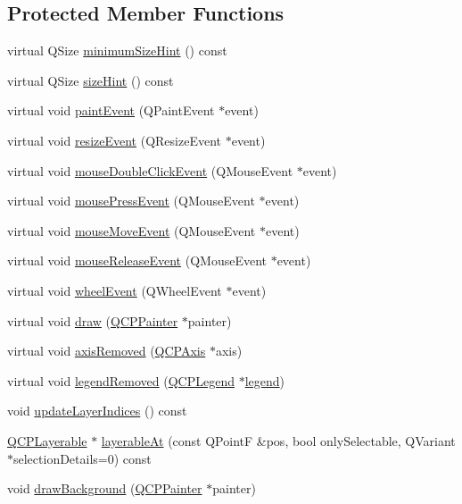 \subsection*{Protected Member Functions}
\begin{DoxyCompactItemize}
\item 
virtual Q\-Size \hyperlink{class_q_custom_plot_a4904f06d831afae29cd5d10e889388c3}{minimum\-Size\-Hint} () const 
\item 
virtual Q\-Size \hyperlink{class_q_custom_plot_a21d84d299c3651ec36d11a7826274a3c}{size\-Hint} () const 
\item 
virtual void \hyperlink{class_q_custom_plot_a2bbc3b1c24bfcc8a7cc1f3008cdd9b73}{paint\-Event} (Q\-Paint\-Event $\ast$event)
\item 
virtual void \hyperlink{class_q_custom_plot_a13e05523a40c3f08875df5cde85cf0d9}{resize\-Event} (Q\-Resize\-Event $\ast$event)
\item 
virtual void \hyperlink{class_q_custom_plot_a77591913a5b543bdc465dd5e08325a49}{mouse\-Double\-Click\-Event} (Q\-Mouse\-Event $\ast$event)
\item 
virtual void \hyperlink{class_q_custom_plot_abce84fa2c71e47b9295d67e8fce84bb4}{mouse\-Press\-Event} (Q\-Mouse\-Event $\ast$event)
\item 
virtual void \hyperlink{class_q_custom_plot_ac64727a4f442770f6e5e6be2d0530843}{mouse\-Move\-Event} (Q\-Mouse\-Event $\ast$event)
\item 
virtual void \hyperlink{class_q_custom_plot_a724e97d2e8c03e68adac5f4b6164a1b3}{mouse\-Release\-Event} (Q\-Mouse\-Event $\ast$event)
\item 
virtual void \hyperlink{class_q_custom_plot_a7b8bd7e8d3a1d23a8595e9c6a6b76ef1}{wheel\-Event} (Q\-Wheel\-Event $\ast$event)
\item 
virtual void \hyperlink{class_q_custom_plot_ad7a7d878bf050f101a43008e7d8fdb52}{draw} (\hyperlink{class_q_c_p_painter}{Q\-C\-P\-Painter} $\ast$painter)
\item 
virtual void \hyperlink{class_q_custom_plot_a8b46607021c463c94709d3504951cb47}{axis\-Removed} (\hyperlink{class_q_c_p_axis}{Q\-C\-P\-Axis} $\ast$axis)
\item 
virtual void \hyperlink{class_q_custom_plot_a9d173454555021c9ffd4f675c4d9037a}{legend\-Removed} (\hyperlink{class_q_c_p_legend}{Q\-C\-P\-Legend} $\ast$\hyperlink{class_q_custom_plot_a73da53368aa4c2db3d874cf0db50d140}{legend})
\item 
void \hyperlink{class_q_custom_plot_a3117754df3a5638787a6223c7147970f}{update\-Layer\-Indices} () const 
\item 
\hyperlink{class_q_c_p_layerable}{Q\-C\-P\-Layerable} $\ast$ \hyperlink{class_q_custom_plot_a3fffd1d8364f657482ae985e0b5aa028}{layerable\-At} (const Q\-Point\-F \&pos, bool only\-Selectable, Q\-Variant $\ast$selection\-Details=0) const 
\item 
void \hyperlink{class_q_custom_plot_a05dd52438cee4353b18c1e53a439008d}{draw\-Background} (\hyperlink{class_q_c_p_painter}{Q\-C\-P\-Painter} $\ast$painter)
\end{DoxyCompactItemize}

